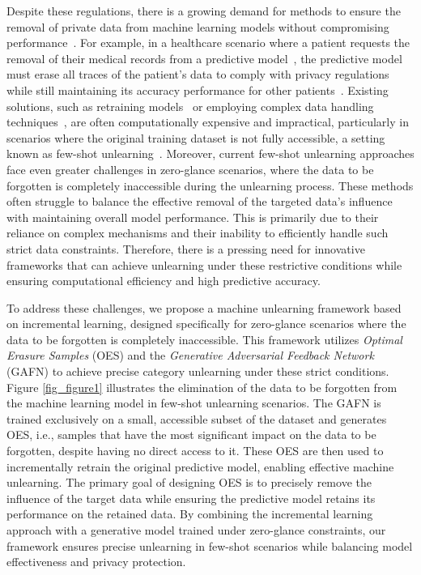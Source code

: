\documentclass[preprint,12pt]{elsarticle}
\begin{document}
Despite these regulations, there is a growing demand for methods to ensure the removal of private data from machine learning models without compromising performance~\cite{al2019privacy}. For example, in a healthcare scenario where a patient requests the removal of their medical records from a predictive model~\cite{miotto2018deep}, the predictive model must erase all traces of the patient's data to comply with privacy regulations while still maintaining its accuracy performance for other patients~\cite{abouelmehdi2018big}. Existing solutions, such as retraining models~\cite{wu2020deltagrad} or employing complex data handling techniques~\cite{shaik2023exploring}, are often computationally expensive and impractical, particularly in scenarios where the original training dataset is not fully accessible, a setting known as few-shot unlearning~\cite{GuoGHM20}. Moreover, current few-shot unlearning approaches face even greater challenges in zero-glance scenarios, where the data to be forgotten is completely inaccessible during the unlearning process. These methods often struggle to balance the effective removal of the targeted data’s influence with maintaining overall model performance. This is primarily due to their reliance on complex mechanisms and their inability to efficiently handle such strict data constraints. Therefore, there is a pressing need for innovative frameworks that can achieve unlearning under these restrictive conditions while ensuring computational efficiency and high predictive accuracy.


To address these challenges, we propose a machine unlearning framework based on incremental learning, designed specifically for zero-glance scenarios where the data to be forgotten is completely inaccessible. This framework utilizes \textit{Optimal Erasure Samples} (OES) and the \textit{Generative Adversarial Feedback Network} (GAFN) to achieve precise category unlearning under these strict conditions. Figure \ref{fig_figure1} illustrates the elimination of the data to be forgotten from the machine learning model in few-shot unlearning scenarios. The GAFN is trained exclusively on a small, accessible subset of the dataset and generates OES, i.e., samples that have the most significant impact on the data to be forgotten, despite having no direct access to it. These OES are then used to incrementally retrain the original predictive model, enabling effective machine unlearning. The primary goal of designing OES is to precisely remove the influence of the target data while ensuring the predictive model retains its performance on the retained data. By combining the incremental learning approach with a generative model trained under zero-glance constraints, our framework ensures precise unlearning in few-shot scenarios while balancing model effectiveness and privacy protection.
\end{document}
